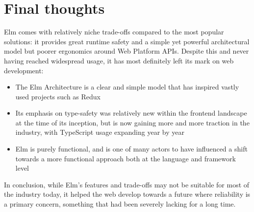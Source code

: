 \section{Final thoughts}
Elm comes with relatively niche trade-offs compared to the most popular solutions: it provides great runtime safety and a simple yet powerful architectural model but poorer ergonomics around Web Platform APIs. Despite this and never having reached widespread usage, it has most definitely left its mark on web development:
\begin{itemize}
    \item The Elm Architecture is a clear and simple model that has inspired vastly used projects such as Redux \cite{noauthor_prior_2024}
    \item Its emphasis on type-safety was relatively new within the frontend landscape at the time of its inception, but is now gaining more and more traction in the industry, with TypeScript usage expanding year by year \cite{staff_octoverse_2024}
    \item Elm is purely functional, and is one of many actors to have influenced a shift towards a more functional approach both at the language and framework level
\end{itemize}
In conclusion, while Elm's features and trade-offs may not be suitable for most of the industry today, it helped the web develop towards a future where reliability is a primary concern, something that had been severely lacking for a long time.
